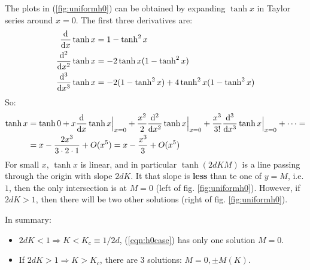 \documentclass[../../main.tex]{subfiles}
\begin{document}
The plots in (\ref{fig:uniformh0}) can be obtained by expanding $\tanh x$ in Taylor series around $x = 0$. The first three derivatives are:
\begin{align*}
    \dv{x} \tanh x &= 1- \tanh^2 x\\
    \dv[2]{x} \tanh x &= -2 \tanh x(1-\tanh^2 x)\\
    \dv[3]{x} \tanh x &= -2(1-\tanh^2 x ) + 4\tanh^2 x (1-\tanh^2 x)
\end{align*}
So:
\begin{align}\nonumber
    \tanh x &= \tanh 0 +x \dv{x}\tanh x\Big|_{x=0} + \frac{x^2}{2} \dv[2]{x} \tanh x\Big|_{x=0} + \frac{x^3}{3!}\dv[3]{x} \tanh x\Big|_{x=0} + \dots = \\
    &= x -\frac{2x^3}{3\cdot 2 \cdot 1} + O(x^5) = x -\frac{x^3}{3} + O(x^5) 
    \label{eqn:tanh-exp}
\end{align}
For small $x$, $\tanh x$ is linear, and in particular $\tanh(2d K M)$ is a line passing through the origin with slope $2dK$. It that slope is \textbf{less}  than te one of $y=M$, i.e. $1$, then the only intersection is at $M=0$ (left of fig. \ref{fig:uniformh0}). However, if $2dK > 1$, then there will be two other solutions (right of fig. \ref{fig:uniformh0}). 

In summary:
\begin{itemize}
    \item $2dK < 1 \Rightarrow K < K_c \equiv 1/2d$, (\ref{eqn:h0case}) has only one solution $M=0$.
    \item If $2dK > 1 \Rightarrow K > K_c$, there are $3$ solutions: $M=0, \pm M(K)$.
\end{itemize}
\end{document}
